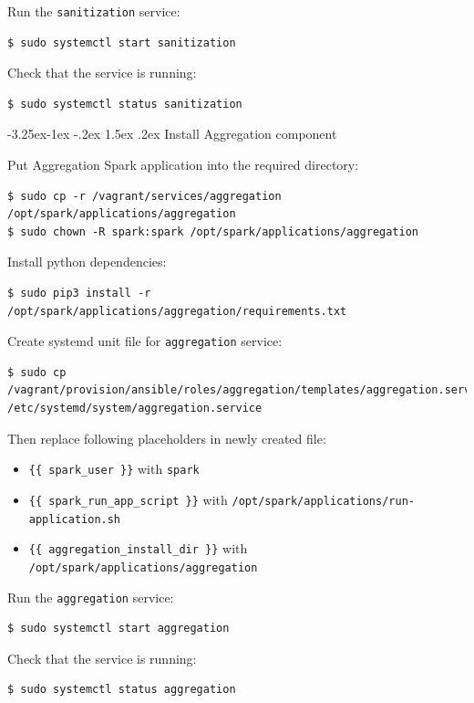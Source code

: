 \documentclass[a4paper]{article} %
\makeatletter
\renewcommand{\normalsize}{\fontsize{12}{15}\selectfont\color{textcolor}}
\renewcommand\subsubsection{\@startsection{subsubsection}{3}{\z@}%
                   {-3.25ex\@plus -1ex \@minus -.2ex}%
                   {1.5ex \@plus .2ex}%
                   {\normalfont\sffamily\normalsize\bfseries\color{projectcolor}}}
\makeatother
\begin{document}
Run the \texttt{sanitization} service:
\begin{lstlisting}
$ sudo systemctl start sanitization
\end{lstlisting}

Check that the service is running:
\begin{lstlisting}
$ sudo systemctl status sanitization
\end{lstlisting}


\subsubsection{Install Aggregation component}

Put Aggregation Spark application into the required directory:
\begin{lstlisting}
$ sudo cp -r /vagrant/services/aggregation /opt/spark/applications/aggregation
$ sudo chown -R spark:spark /opt/spark/applications/aggregation
\end{lstlisting}

Install python dependencies:
\begin{lstlisting}
$ sudo pip3 install -r /opt/spark/applications/aggregation/requirements.txt
\end{lstlisting}

Create systemd unit file for \texttt{aggregation} service:
\begin{lstlisting}
$ sudo cp /vagrant/provision/ansible/roles/aggregation/templates/aggregation.service.j2 /etc/systemd/system/aggregation.service
\end{lstlisting}

Then replace following placeholders in newly created file:
\begin{itemize}[noitemsep,nolistsep]
\item \texttt{\{\{ spark\_user \}\}} with \texttt{spark}
\item \texttt{\{\{ spark\_run\_app\_script \}\}} with \texttt{/opt/spark/applications/run-application.sh}
\item \texttt{\{\{ aggregation\_install\_dir \}\}} with \texttt{/opt/spark/applications/aggregation}
\end{itemize}

Run the \texttt{aggregation} service:
\begin{lstlisting}
$ sudo systemctl start aggregation
\end{lstlisting}

Check that the service is running:
\begin{lstlisting}
$ sudo systemctl status aggregation
\end{lstlisting}
\end{document}
